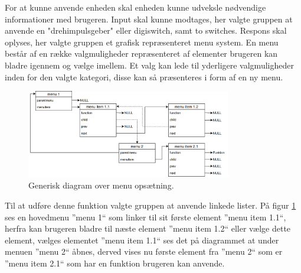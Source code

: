 For at kunne anvende enheden skal enheden kunne udveksle nødvendige informationer med brugeren. 
Input skal kunne modtages, her valgte gruppen at anvende en "drehimpulsgeber" eller digiswitch, samt to switches.
Respons skal oplyses, her valgte gruppen et grafisk repræsenteret menu system.
En menu består af en række valgmuligheder repræsenteret af elementer brugeren kan bladre igennem og vælge imellem.
Et valg kan lede til yderligere valgmuligheder inden for den valgte kategori, disse kan så præsenteres i form af en ny menu.
\begin{figure}[!ht]
	\centering 
	\includegraphics[width=0.8\textwidth]{billeder/menuesdiagram.png} 
	\caption{Generisk diagram over menu opsætning. } 
	\label{fig:menuesdiagram} 
\end{figure}
Til at udføre denne funktion valgte gruppen at anvende linkede lister.\newline
På figur \ref{fig:menuesdiagram} ses en hovedmenu ''menu 1`` som linker til sit første element ''menu item 1.1``, herfra kan brugeren bladre til næste element ''menu item 1.2`` eller vælge dette element, vælges elementet ''menu item 1.1`` ses det på diagrammet at under menuen ''menu 2`` åbnes, derved vises nu første element fra ''menu 2`` som er ''menu item 2.1`` som har en funktion brugeren kan anvende.
